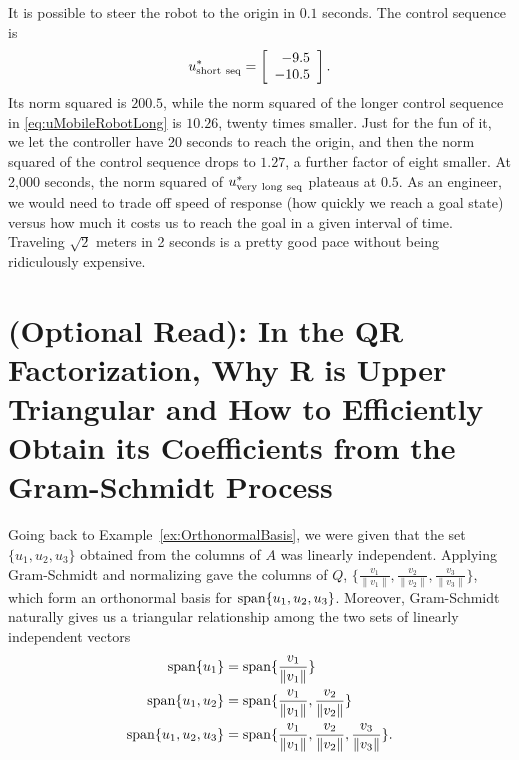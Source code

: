It is possible to steer the robot to the origin in $0.1$ seconds. The control sequence is 
$$ u_{\rm short~seq}^\ast = \left[
\begin{array}{r}-9.5 \\ -10.5\end{array} \right]. $$
Its norm squared is $200.5$, while the norm squared of the longer control sequence in \eqref{eq:uMobileRobotLong} is $10.26$, twenty times smaller. Just for the fun of it, we let the controller have 20 seconds to reach the origin, and then the norm squared of the control sequence drops to $1.27$, a further factor of eight smaller. At 2,000 seconds, the norm squared of $u_{\rm very ~long~seq}^\ast$ plateaus at $0.5$. As an engineer, we would need to trade off speed of response (how quickly we reach a goal state) versus how much it costs us to reach the goal in a given interval of time. Traveling $\sqrt{2}$ meters in 2 seconds is a pretty good pace without being ridiculously expensive.

\section{(Optional Read): In the QR Factorization, Why R is Upper Triangular and How to Efficiently Obtain its Coefficients from the Gram-Schmidt Process}
 
Going back to Example~\ref{ex:OrthonormalBasis}, we were given that the set $\{u_1, u_2, u_3\}$ obtained from the columns of $A$ was linearly independent. Applying Gram-Schmidt and normalizing gave the columns of $Q$, $\{ \frac{v_1}{\| v_1 \|}, \frac{v_2}{\| v_2 \|}, \frac{v_3}{\| v_3 \|} \}$, which form an orthonormal basis for $\mathrm{span} \{ u_1, u_2, u_3 \}$. Moreover, Gram-Schmidt naturally gives us a triangular relationship among the two sets of linearly independent vectors
\begin{align*}
  \mathrm{span} \{ u_1 \} &= \mathrm{span} \{  \frac{v_1}{\| v_1 \|}  \}\\
  \mathrm{span} \{ u_1, u_2 \} &= \mathrm{span} \{  \frac{v_1}{\| v_1 \|}, \frac{v_2}{\| v_2 \|}  \} \\
     \mathrm{span} \{ u_1, u_2, u_3 \}& =  \mathrm{span} \{  \frac{v_1}{\| v_1 \|}, \frac{v_2}{\| v_2 \|}, \frac{v_3}{\| v_3 \|}  \}.
\end{align*}

